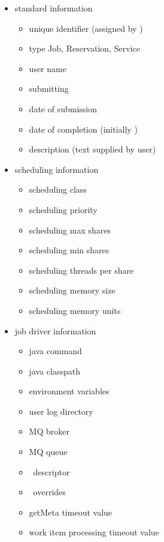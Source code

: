     \begin{itemize}
    
      \begin{itemize}
      \item standard information
        \begin{itemize}
          \item unique identifier (assigned by \varDUCC)
          \item type {Job, Reservation, Service}
          \item user name
          \item submitting \varPID
          \item date of submission
          \item date of completion (initially \varNull)
          \item description (text supplied by user)
        \end{itemize} 
      \item scheduling information
        \begin{itemize}
          \item scheduling class
          \item scheduling priority
          \item scheduling max shares
          \item scheduling min shares
          \item scheduling threads per share
          \item scheduling memory size
          \item scheduling memory units
        \end{itemize} 
      \item job driver information
        \begin{itemize}
          \item java command
          \item java classpath
          \item environment variables
          \item user log directory
          \item MQ broker
          \item MQ queue
          \item \varCollectionReader~descriptor
          \item \varCollectionReader~overrides
          \item getMeta timeout value
          \item work item processing timeout value

\end{itemize}
\end{itemize}
\end{itemize}
